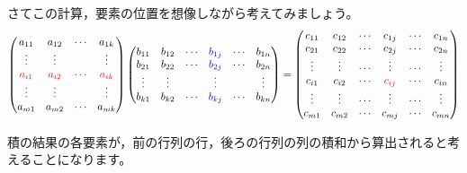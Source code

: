 \documentclass{ltjsbook}
\begin{document}
さてこの計算，要素の位置を想像しながら考えてみましょう。
\[
	\begin{pmatrix}
		a_{11}                  & a_{12}                  & \cdots                  & a_{1k}                  \\
		\vdots                  & \vdots                  &                         & \vdots                  \\
		\textcolor{red}{a_{i1}} & \textcolor{red}{a_{i2}} & \textcolor{red}{\cdots} & \textcolor{red}{a_{ik}} \\
		\vdots                  & \vdots                  &                         & \vdots                  \\
		a_{m1}                  & a_{m2}                  & \cdots                  & a_{mk}
	\end{pmatrix}
	\begin{pmatrix}
		b_{11} & b_{12} & \cdots & \textcolor{blue}{b_{1j}} & \cdots & b_{1n} \\
		b_{21} & b_{22} & \cdots & \textcolor{blue}{b_{2j}} & \cdots & b_{2n} \\
		\vdots & \vdots &        & \textcolor{blue}{\vdots} &        & \vdots \\
		b_{k1} & b_{k2} & \cdots & \textcolor{blue}{b_{kj}} & \cdots & b_{kn} \\
	\end{pmatrix}
	=
	\begin{pmatrix}
		c_{11} & c_{12} & \cdots & c_{1j}                      & \cdots & c_{1n} \\
		c_{21} & c_{22} & \cdots & c_{2j}                      & \cdots & c_{2n} \\
		\vdots & \vdots & \cdots & \vdots                      & \cdots & \vdots \\
		c_{i1} & c_{i2} & \cdots & \textcolor{purple!}{c_{ij}} & \cdots & c_{in} \\
		\vdots & \vdots & \cdots & \vdots                      & \cdots & \vdots \\
		c_{m1} & c_{m2} & \cdots & c_{mj}                      & \cdots & c_{mn} \\
	\end{pmatrix}
\]

積の結果の各要素が，前の行列の行，後ろの行列の列の積和から算出されると考えることになります。
\end{document}
